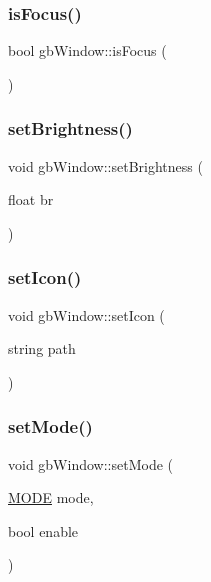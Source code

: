 \subsubsection{\texorpdfstring{isFocus()}{isFocus()}}
{\footnotesize\ttfamily bool gb\+Window\+::is\+Focus (\begin{DoxyParamCaption}{ }\end{DoxyParamCaption})}

\mbox{\label{classgb_window_ad05c721b3e04f23f0e6b72e4c411be1c}} 
\subsubsection{\texorpdfstring{setBrightness()}{setBrightness()}}
{\footnotesize\ttfamily void gb\+Window\+::set\+Brightness (\begin{DoxyParamCaption}\item[{float}]{br }\end{DoxyParamCaption})}

\mbox{\label{classgb_window_ae23cb1d0f10770397014d812c4339e01}} 
\subsubsection{\texorpdfstring{setIcon()}{setIcon()}}
{\footnotesize\ttfamily void gb\+Window\+::set\+Icon (\begin{DoxyParamCaption}\item[{string}]{path }\end{DoxyParamCaption})}

\mbox{\label{classgb_window_a78354f1a4f6ed885c055e5b14ab005a6}} 
\subsubsection{\texorpdfstring{setMode()}{setMode()}}
{\footnotesize\ttfamily void gb\+Window\+::set\+Mode (\begin{DoxyParamCaption}\item[{\mbox{\hyperlink{classgb_window_a19e70d277e17598ddb3c229e28dbb9e9}{M\+O\+DE}}}]{mode,  }\item[{bool}]{enable }\end{DoxyParamCaption})}


